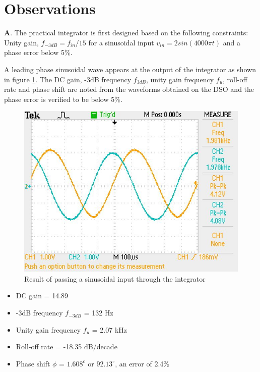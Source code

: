 \documentclass[12pt, titlepage]{article}
\theoremstyle{definition}
\begin{document}
  \newpage
  \section{Observations}
    \textbf{A}. The practical integrator is first designed based on the following constraints:
    Unity gain, $f_{-3dB} = f_{in}/15$ for a sinusoidal input
    $v_{in} = 2 sin(4000\pi t)$ and a phase error below 5\%.

    A leading phase sinusoidal wave appears at the output of the integrator as shown in figure \ref{fig:results_q1}.
    The DC gain, -3dB frequency $f_{3dB}$, unity gain frequency $f_u$, roll-off rate and phase shift are noted from the waveforms obtained on the DSO and the phase error is verified to be below 5\%.

    \begin{figure}
      \includegraphics[scale=0.25]{images/results_q1.jpeg}
      \caption{Result of passing a sinusoidal input through the integrator}
      \label{fig:results_q1}
    \end{figure}

    \begin{itemize}
      \item[] DC gain = 14.89
      \item[] -3dB frequency $f_{-3dB}$ = 132 Hz
      \item[] Unity gain frequency $f_u$ = 2.07 kHz
      \item[] Roll-off rate = -18.35 dB/decade
      \item[] Phase shift $\phi$ = $1.608^{c}$ or $92.13^{\circ}$, an error of 2.4\%
    \end{itemize}
\end{document}
